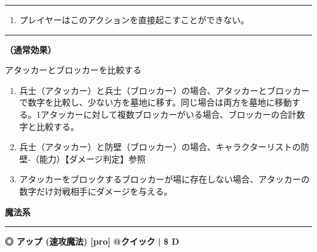\documentclass[twocolumn,a5paper,papersize,10pt]{jarticle}
\begin{document}
\vspace{1mm}%
\hrule height 0.1mm depth 0mm width 66.5mm %
\vspace{1mm}%


\vspace{-1zh}%
\begin{enumerate}
\renewcommand{\labelenumi}{※}
\setlength{\leftskip}{-0.3cm}
\setlength{\itemsep}{0pt} %
\setlength{\parskip}{0pt} %

\item プレイヤーはこのアクションを直接起こすことができない。

\vspace{-3mm}%
\end{enumerate}
\vspace{1mm}%
\hrule height 0.1mm depth 0mm width 66.5mm %
\vspace{1mm}%

{\bf（通常効果）}

アタッカーとブロッカーを比較する


\vspace{-1zh}%
\begin{enumerate}
\setlength{\leftskip}{-0.3cm}
\setlength{\parskip}{0pt} %

\item 兵士（アタッカー）と兵士（ブロッカー）の場合、アタッカーとブロッカーで数字を比較し、少ない方を墓地に移す。同じ場合は両方を墓地に移動する。1アタッカーに対して複数ブロッカーがいる場合、ブロッカーの合計数字と比較する。

\item 兵士（アタッカー）と防壁（ブロッカー）の場合、キャラクターリストの防壁-（能力）【ダメージ判定】参照

\item アタッカーをブロックするブロッカーが場に存在しない場合、アタッカーの数字だけ対戦相手にダメージを与える。
\vspace{-1zh}%
\end{enumerate}


\begin{tcolorbox}
{\scriptsize\bf 魔法系}
\end{tcolorbox}
\vspace{-1zh}%
\vspace{2mm} %
\hrule height 0.5mm depth 0mm width 66.5mm %
\vspace{1mm} %
{\small\bf ◎ アップ {\scriptsize (速攻魔法) [pro]}} %
\hfill 
{\footnotesize\bf @クイック }
  {\footnotesize\bf | } {\footnotesize\bf \$ D}
\end{document}
